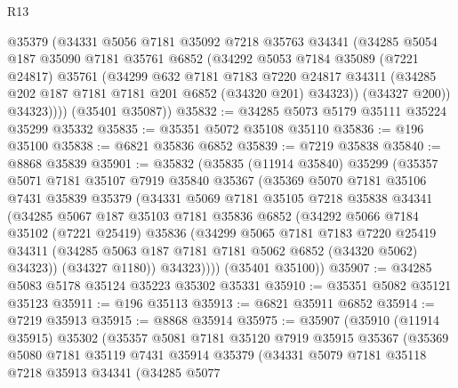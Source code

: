 \begin{lexlean}{R13}
\begin{coremodule}
          @35379
          (@34331
            @5056
            @7181
            @35092
            @7218
            @35763
            @34341
            (@34285
              @5054
              @187
              @35090
              @7181
              @35761
              @6852
              (@34292
                @5053
                @7184
                @35089
                (@7221 @24817)
                @35761
                (@34299
                  @632
                  @7181
                  @7183
                  @7220
                  @24817
                  @34311
                  (@34285 @202 @187 @7181 @7181 @201 @6852 (@34320 @201) @34323))
                (@34327 @200))
              @34323))))
      (@35401 @35087))
@35832 := @34285 @5073 @5179 @35111 @35224 @35299 @35332
@35835 := @35351 @5072 @35108 @35110
@35836 := @196 @35100
@35838 := @6821 @35836 @6852
@35839 := @7219 @35838
@35840 := @8868 @35839
@35901 := @35832
    (@35835
      (@11914 @35840)
      @35299
      (@35357
        @5071
        @7181
        @35107
        @7919
        @35840
        @35367
        (@35369
          @5070
          @7181
          @35106
          @7431
          @35839
          @35379
          (@34331
            @5069
            @7181
            @35105
            @7218
            @35838
            @34341
            (@34285
              @5067
              @187
              @35103
              @7181
              @35836
              @6852
              (@34292
                @5066
                @7184
                @35102
                (@7221 @25419)
                @35836
                (@34299
                  @5065
                  @7181
                  @7183
                  @7220
                  @25419
                  @34311
                  (@34285 @5063 @187 @7181 @7181 @5062 @6852 (@34320 @5062) @34323))
                (@34327 @1180))
              @34323))))
      (@35401 @35100))
@35907 := @34285 @5083 @5178 @35124 @35223 @35302 @35331
@35910 := @35351 @5082 @35121 @35123
@35911 := @196 @35113
@35913 := @6821 @35911 @6852
@35914 := @7219 @35913
@35915 := @8868 @35914
@35975 := @35907
    (@35910
      (@11914 @35915)
      @35302
      (@35357
        @5081
        @7181
        @35120
        @7919
        @35915
        @35367
        (@35369
          @5080
          @7181
          @35119
          @7431
          @35914
          @35379
          (@34331
            @5079
            @7181
            @35118
            @7218
            @35913
            @34341
            (@34285
              @5077

\end{coremodule}
\end{lexlean}
